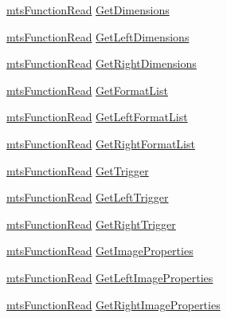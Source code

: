 \begin{DoxyCompactItemize}
\item 
\hyperlink{classmts_function_read}{mts\+Function\+Read} \hyperlink{class_i_req_filter_source_video_capture_a2aef6432030e6c1ec872c73a91622489}{Get\+Dimensions}
\item 
\hyperlink{classmts_function_read}{mts\+Function\+Read} \hyperlink{class_i_req_filter_source_video_capture_a1aefb74ebf1877ccbcdf89a6366c248b}{Get\+Left\+Dimensions}
\item 
\hyperlink{classmts_function_read}{mts\+Function\+Read} \hyperlink{class_i_req_filter_source_video_capture_a26413761bff0d0cf3ddc2b778c98affa}{Get\+Right\+Dimensions}
\item 
\hyperlink{classmts_function_read}{mts\+Function\+Read} \hyperlink{class_i_req_filter_source_video_capture_ac3026a5fc8bf911cf0a1dc2146e811af}{Get\+Format\+List}
\item 
\hyperlink{classmts_function_read}{mts\+Function\+Read} \hyperlink{class_i_req_filter_source_video_capture_ab6b58da067122b32245d7c89ad41be47}{Get\+Left\+Format\+List}
\item 
\hyperlink{classmts_function_read}{mts\+Function\+Read} \hyperlink{class_i_req_filter_source_video_capture_aee68db7930a53c1f5d39959850d18c32}{Get\+Right\+Format\+List}
\item 
\hyperlink{classmts_function_read}{mts\+Function\+Read} \hyperlink{class_i_req_filter_source_video_capture_a0436eb250f5e4432e01f809a1ca104e2}{Get\+Trigger}
\item 
\hyperlink{classmts_function_read}{mts\+Function\+Read} \hyperlink{class_i_req_filter_source_video_capture_a2bbe9cd5724989b3f2f86a824bb801db}{Get\+Left\+Trigger}
\item 
\hyperlink{classmts_function_read}{mts\+Function\+Read} \hyperlink{class_i_req_filter_source_video_capture_a784d756deb14f6e2e8b5b17adfbd43f0}{Get\+Right\+Trigger}
\item 
\hyperlink{classmts_function_read}{mts\+Function\+Read} \hyperlink{class_i_req_filter_source_video_capture_a642db47821c08a6fba6e73a55786257a}{Get\+Image\+Properties}
\item 
\hyperlink{classmts_function_read}{mts\+Function\+Read} \hyperlink{class_i_req_filter_source_video_capture_ab8d53564d42d21102b8c3deb3c6031c7}{Get\+Left\+Image\+Properties}
\item 
\hyperlink{classmts_function_read}{mts\+Function\+Read} \hyperlink{class_i_req_filter_source_video_capture_a004909aca70b016a7dda598a3a6ea8ae}{Get\+Right\+Image\+Properties}
\end{DoxyCompactItemize}


